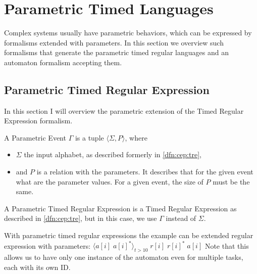 	
	\section{Parametric Timed Languages}
	
			Complex systems usually have parametric behaviors, which can be expressed by formalisms extended with parameters. In this section we overview such formalisms that generate the parametric timed regular languages and an automaton formalism accepting them.
			
		\subsection{Parametric Timed Regular Expression}
		
		In this section I will overview the parametric extension of the Timed Regular Expression formalism.
			
			\begin{dfn}
				\label{dfn:cep:ptrea:event}
				A Parametric Event $\Gamma$ is a tuple $\langle \Sigma, P \rangle$, where 
				\begin{itemize}
					\item $\Sigma$ the input alphabet, as described formerly in \cref{dfn:cep:tre},
					\item and $P$ is a relation with the parameters. It describes that for the given event what are the parameter values. For a given event, the size of $P$ must be the same.
				\end{itemize}
			\end{dfn}
			
	
			\begin{dfn}
			A Parametric Timed Regular Expression is a Timed Regular Expression as described in \cref{dfn:cep:tre}, but in this case, we use $\Gamma$ instead of $\Sigma$.
			
			\end{dfn}
			
			With parametric timed regular expressions the example can be extended regular expression with parameters:
			$ \langle a[i] \; a[i]^\ast \rangle_{t > 10} \; r[i] \; r[i]^\ast \; a[i]$ %
			Note that this allows us to have only one instance of the automaton even for multiple tasks, each with its own ID.
		
